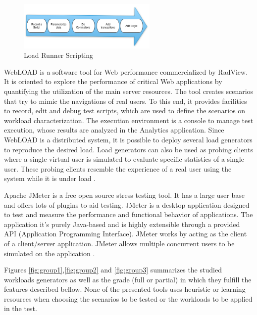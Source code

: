 \documentclass{report}
\begin{document}
\begin{figure}[!ht]
\centering
\includegraphics[width=0.6\textwidth]{./images/loadrunner.png}
\caption{Load Runner Scripting}
\label{fig:loadrunner}
\end{figure}



WebLOAD is a software tool for Web performance commercialized by RadView. It is oriented to explore the performance of critical Web applications by quantifying the utilization of the main server resources. The tool creates scenarios that try to mimic the navigations of real users. To this end, it provides facilities to record, edit and debug test scripts, which are used to define the scenarios on workload characterization. The execution environment is a console to manage test execution, whose results are analyzed in the Analytics application. Since WebLOAD is a distributed system, it is possible to deploy several load generators to reproduce the desired load. Load generators can also be used as probing clients where a single virtual user is simulated to evaluate specific statistics of a single user. These probing clients resemble the experience of a real user using the system while it is under load \cite{MohammadS.Obaidat}.

Apache JMeter is a free open source stress testing tool.  It has a large user base and offers lots of plugins to aid testing. JMeter is a desktop application designed to test and measure the performance and functional behavior of applications. The application it's purely Java-based and is highly extensible through a provided API (Application Programming Interface). JMeter works by acting as the client of a client/server application. JMeter allows multiple concurrent users to be simulated on the application \cite{Halili2008} \cite{Erinle2013}. 









Figures \ref{fig:group1},\ref{fig:group2} and \ref{fig:group3} summarizes the studied workloads generators as well as the grade (full or partial) in which they fulfill the features described bellow. None of the presented tools uses heuristic or learning resources when choosing the scenarios to be tested or the workloads to be applied in the test.
\end{document}
